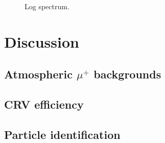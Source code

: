 \begin{figure}
    \centering
    
    \caption{Log spectrum.}
    \label{fig:log_spectrum}
\end{figure}

\section{Discussion}

\subsection{Atmospheric $\mu^+$ backgrounds}

\subsection{CRV efficiency}

\subsection{Particle identification}
